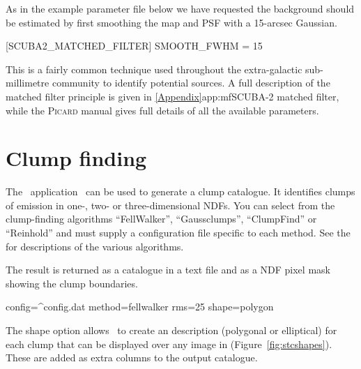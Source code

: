 \begin{terminalv}
\end{terminalv}

As in the example parameter file below we have requested the
background should be estimated by first smoothing the map and PSF with
a 15-arcsec Gaussian.

\begin{terminalv}

[SCUBA2_MATCHED_FILTER]
SMOOTH_FWHM = 15

\end{terminalv}

This is a fairly common technique used throughout the extra-galactic
sub-millimetre community to identify potential sources. A full
description of the matched filter principle is given in
\cref{Appendix}{app:mf}{SCUBA-2 matched filter}, while the
\textsc{Picard} manual gives full details of all the available
parameters.

\section{Clump finding}
\label{sec:clumps}
\label{sec:clumpfind}

The \cupid\ application \findclumps\ can be used to generate a clump
catalogue. It identifies clumps of emission in one-, two- or
three-dimensional NDFs. You can select from the clump-finding
algorithms ``FellWalker''\cite{fellwalker}, ``Gaussclumps'',
``ClumpFind'' or ``Reinhold'' and must supply a configuration file
specific to each method. See the 
for descriptions of the various algorithms.

The result is returned as a catalogue in a text file and as a NDF
pixel mask showing the clump boundaries.

\begin{terminalv}
  config=^config.dat method=fellwalker rms=25 shape=polygon
\end{terminalv}

The shape option allows \findclumps\ to create an
description (polygonal or elliptical) for each clump that
can be displayed over any image in \gaia (Figure~\ref{fig:stcshapes}). 
These are added as extra columns to the output catalogue.

